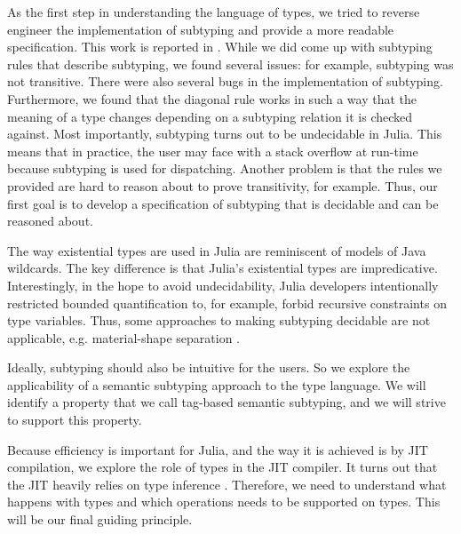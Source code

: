 As the first step in understanding the language of types, we tried to reverse
engineer the implementation of subtyping and provide a more readable
specification. This work is reported in .
While we did come up with subtyping rules that describe subtyping, we found
several issues: for example, subtyping was not transitive. There were also
several bugs in the implementation of subtyping. Furthermore, we found that the
diagonal rule works in such a way that the meaning of a type changes depending
on a subtyping relation it is checked against.
Most importantly, subtyping turns out to be undecidable in Julia. This means
that in practice, the user may face with a stack overflow at run-time because
subtyping is used for dispatching.
Another problem is that the rules we provided are hard to reason about to prove
transitivity, for example.
Thus, our first goal is to develop a specification of subtyping that is
decidable and can be reasoned about.

The way existential types are used in Julia are reminiscent of models of Java
wildcards. The key difference is that Julia's existential types are
impredicative. Interestingly, in the hope to avoid undecidability, Julia
developers intentionally restricted bounded quantification to, for example,
forbid recursive constraints on type variables.
Thus, some approaches to making subtyping decidable are not applicable, e.g.
material-shape separation .

Ideally, subtyping should also be intuitive for the users. So we explore the
applicability of a semantic subtyping approach to the type language. We will
identify a property that we call tag-based semantic subtyping, and we will
strive to support this property.

Because efficiency is important for Julia, and the way it is achieved is by JIT
compilation, we explore the role of types in the JIT compiler. It turns out that
the JIT heavily relies on type inference . Therefore, we need to
understand what happens with types and which operations needs to be supported on
types. This will be our final guiding principle.
